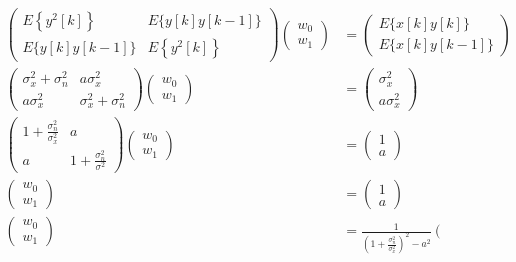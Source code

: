 $$
\begin{aligned}
\left(\begin{array}{cc}
E\left\{y^2[k]\right\} & E\{y[k] y[k-1]\} \\
E\{y[k] y[k-1]\} & E\left\{y^2[k]\right\}
\end{array}\right)\left(\begin{array}{l}
w_0 \\
w_1
\end{array}\right) & =\left(\begin{array}{c}
E\{x[k] y[k]\} \\
E\{x[k] y[k-1]\}
\end{array}\right) \\
\left(\begin{array}{cc}
\sigma_x^2+\sigma_n^2 & a \sigma_x^2 \\
a \sigma_x^2 & \sigma_x^2+\sigma_n^2
\end{array}\right)\left(\begin{array}{l}
w_0 \\
w_1
\end{array}\right) & =\left(\begin{array}{c}
\sigma_x^2 \\
a \sigma_x^2
\end{array}\right) \\
\left(\begin{array}{cc}
1+\frac{\sigma_n^2}{\sigma_x^2} & a \\
a & 1+\frac{\sigma_n^2}{\sigma^2}
\end{array}\right)\left(\begin{array}{l}
w_0 \\
w_1
\end{array}\right) & =\left(\begin{array}{c}
1 \\
a
\end{array}\right)\\
\left(\begin{array}{l}
w_0 \\
w_1
\end{array}\right)&=\left(\begin{array}{c}
1 \\
a
\end{array}\right) \\
\left(\begin{array}{l}
w_0 \\
w_1
\end{array}\right)&=\frac{1}{\left(1+\frac{\sigma_n^2}{\sigma_x^2}\right)^2-a^2}\left(\begin{array}{cc}

\end{array}
\end{aligned}$$
